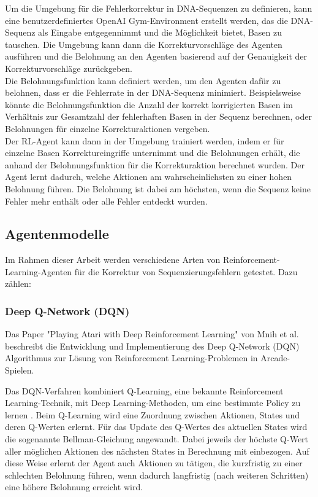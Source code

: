 \documentclass[oneside,bibliography=totocnumbered,BCOR=5mm]{scrbook}%
\theoremstyle{definition}
\theoremstyle{definition}
\theoremstyle{definition}
\theoremstyle{definition}
\theoremstyle{definition}
\theoremstyle{definition}
\begin{document}
Um die Umgebung für die Fehlerkorrektur in DNA-Sequenzen zu definieren, kann eine benutzerdefiniertes OpenAI
Gym-Environment erstellt werden, das die DNA-Sequenz als Eingabe entgegennimmt und die Möglichkeit bietet, 
Basen zu tauschen. 
Die Umgebung kann dann die Korrekturvorschläge des Agenten ausführen und die Belohnung an den Agenten basierend 
auf der Genauigkeit der Korrekturvorschläge zurückgeben. \\


Die Belohnungsfunktion kann definiert werden, um den Agenten dafür zu belohnen, 
dass er die Fehlerrate in der DNA-Sequenz minimiert. 
Beispielsweise könnte die Belohnungsfunktion die Anzahl der korrekt korrigierten Basen im 
Verhältnis zur Gesamtzahl der fehlerhaften Basen in der Sequenz berechnen, oder Belohnungen 
für einzelne Korrekturaktionen vergeben. \\


Der RL-Agent kann dann in der Umgebung trainiert werden, indem er für einzelne Basen Korrektureingriffe unternimmt 
und die Belohnungen erhält, die anhand der Belohnungsfunktion für die Korrekturaktion berechnet wurden. 
Der Agent lernt dadurch, welche Aktionen am wahrscheinlichsten zu einer hohen Belohnung führen.
Die Belohnung ist dabei am höchsten, wenn die Sequenz keine Fehler mehr enthält oder alle Fehler entdeckt wurden. \\

\subsection{Agentenmodelle}

Im Rahmen dieser Arbeit werden verschiedene Arten von Reinforcement-Learning-Agenten
für die Korrektur von Sequenzierungsfehlern getestet. Dazu zählen: \\

\subsubsection{Deep Q-Network (DQN)}
Das Paper "Playing Atari with Deep Reinforcement Learning" von 
  Mnih et al. beschreibt die Entwicklung und Implementierung des Deep Q-Network (DQN) 
  Algorithmus zur Lösung von Reinforcement Learning-Problemen in Arcade-Spielen.

  Das DQN-Verfahren kombiniert Q-Learning, eine bekannte Reinforcement Learning-Technik, 
  mit Deep Learning-Methoden, um eine bestimmte Policy zu lernen \autocite[Seite 4]{DQN}.
  Beim Q-Learning wird eine Zuordnung zwischen Aktionen, States und deren Q-Werten erlernt.
  Für das Update des Q-Wertes des aktuellen States wird die sogenannte Bellman-Gleichung angewandt.
  Dabei jeweils der höchste Q-Wert aller möglichen Aktionen des nächsten States in Berechnung mit einbezogen. 
  Auf diese Weise erlernt der Agent auch Aktionen zu tätigen, die kurzfristig zu einer schlechten
  Belohnung führen, wenn dadurch langfristig (nach weiteren Schritten) eine höhere Belohnung erreicht wird.
\end{document}
